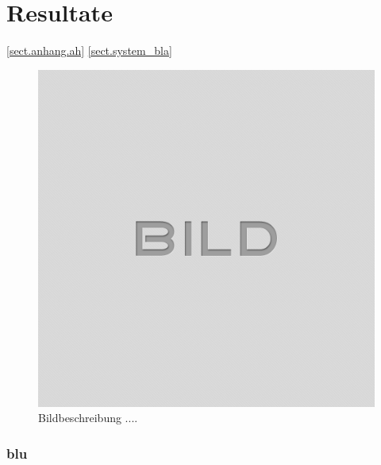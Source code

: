 
\chapter{Resultate}\label{chap.resultate}

\ref{sect.anhang.ah} 
\ref{sect.system_bla}

\begin{figure}[H]
	\centering
	\includegraphics[width=\textwidth]{images/idle.png}
	\caption{Bildbeschreibung ....}
	\label{fig.system.bild8}
\end{figure}

\subsection{blu}\label{sect.system_blue}



